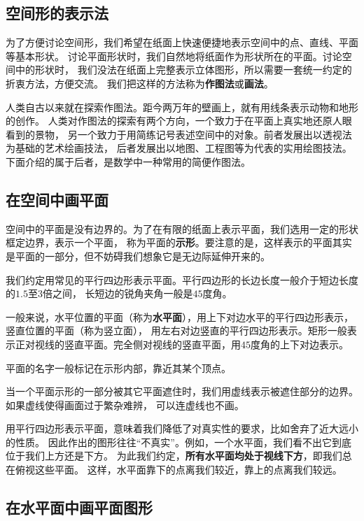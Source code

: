 \documentclass[12pt,UTF8]{ctexbook}
\begin{document}
\begin{appendix}

\chapter{空间形的表示法}

为了方便讨论空间形，我们希望在纸面上快速便捷地表示空间中的点、直线、平面等基本形状。
讨论平面形状时，我们自然地将纸面作为形状所在的平面。讨论空间中的形状时，
我们没法在纸面上完整表示立体图形，所以需要一套统一约定的折衷方法，方便交流。
我们把这样的方法称为\textbf{作图法}或\textbf{画法}。

人类自古以来就在探索作图法。距今两万年的壁画上，就有用线条表示动物和地形的创作。
人类对作图法的探索有两个方向，一个致力于在平面上真实地还原人眼看到的景物，
另一个致力于用简练记号表述空间中的对象。前者发展出以透视法为基础的艺术绘画技法，
后者发展出以地图、工程图等为代表的实用绘图技法。
下面介绍的属于后者，是数学中一种常用的简便作图法。

\section{在空间中画平面}

空间中的平面是没有边界的。为了在有限的纸面上表示平面，我们选用一定的形状框定边界，表示一个平面，
称为平面的\textbf{示形}。要注意的是，这样表示的平面其实是平面的一部分，但不妨碍我们想象它是无边际延伸开来的。

我们约定用常见的平行四边形表示平面。平行四边形的长边长度一般介于短边长度的$1.5$至$3$倍之间，
长短边的锐角夹角一般是$45$度角。

一般来说，水平位置的平面（称为\textbf{水平面}），用上下对边水平的平行四边形表示，竖直位置的平面（称为竖立面），
用左右对边竖直的平行四边形表示。矩形一般表示正对视线的竖直平面。完全侧对视线的竖直平面，用$45$度角的上下对边表示。

平面的名字一般标记在示形内部，靠近其某个顶点。

当一个平面示形的一部分被其它平面遮住时，我们用虚线表示被遮住部分的边界。如果虚线使得画面过于繁杂难辨，
可以连虚线也不画。

用平行四边形表示平面，意味着我们降低了对真实性的要求，比如舍弃了近大远小的性质。
因此作出的图形往往“不真实”。例如，一个水平面，我们看不出它到底位于我们上方还是下方。
为此我们约定，\textbf{所有水平面均处于视线下方}，即我们总在俯视这些平面。
这样，水平面靠下的点离我们较近，靠上的点离我们较远。

\section{在水平面中画平面图形}


\end{appendix}
\end{document}
